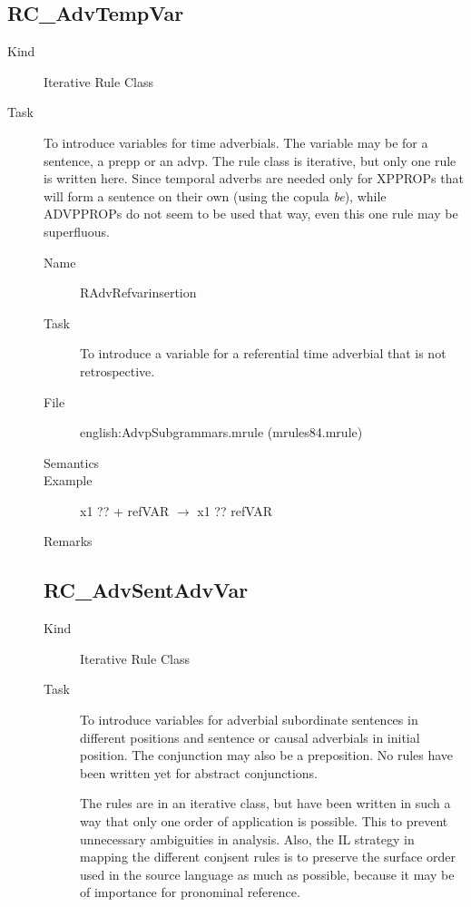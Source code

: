 \newpage
\subsection{RC\_AdvTempVar}
\begin{description}
\item[Kind] Iterative Rule Class
\item[Task] To introduce variables for time adverbials. The variable may be for 
a sentence, a prepp or an advp. The rule class is iterative, but only one rule 
is written here. Since temporal adverbs are needed only for XPPROPs that will 
form a sentence on their own (using the copula {\em be\/}), while ADVPPROPs 
do not seem to be used that way, even this one rule may be superfluous.

\vspace{1 cm}
\begin{description}
\item[Name] RAdvRefvarinsertion
\item[Task] To introduce a variable for a referential time adverbial that is 
not retrospective.
\item[File] english:AdvpSubgrammars.mrule (mrules84.mrule)
\item[Semantics]
\item[Example] x1 ?? + refVAR $\rightarrow$ x1 ?? refVAR 
\item[Remarks]
\end{description}

\newpage
\subsection{RC\_AdvSentAdvVar}
\begin{description}
\item[Kind] Iterative Rule Class
\item[Task] To introduce variables for adverbial subordinate sentences in 
different positions and sentence or causal adverbials in initial position. The 
conjunction may also be a preposition. No rules have been written yet for 
abstract conjunctions.

The rules are in an iterative class, but have been written in such a way that 
only one order of application is possible. This to prevent unnecessary 
ambiguities in analysis. Also, the IL strategy in mapping the different 
conjsent rules is to preserve the surface order used in the source language as 
much as possible, because it may be of importance for pronominal reference.


\end{description}
\end{description}
